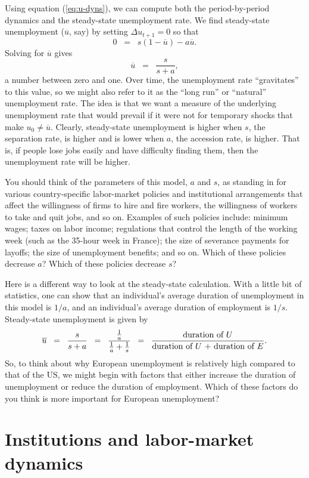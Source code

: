 Using equation (\ref{eq:u-dyns}), we can compute
both the period-by-period dynamics and the steady-state unemployment rate.
We find steady-state unemployment ($\overline{u}$, say) by setting $\Delta u_{t+1}=0$ so that
\[
    0 \;\;=\;\; s(1-\overline{u})-a\overline{u}.
\]
Solving for $\overline{u}$ gives
\[
    \overline{u} \;\;=\;\; \frac{s}{s+a},
\]
a number between zero and one. Over time, the unemployment rate ``gravitates'' to this value, so we might also refer to it as the ``long run'' or ``natural'' unemployment rate.
The idea is that we want a measure of the underlying unemployment rate that would prevail if it were not for temporary shocks that make $u_0\ne\overline{u}$.
Clearly, steady-state unemployment is higher when $s$, the separation rate, is higher and is lower when $a$, the accession rate, is higher. That is, if people lose jobs easily and have difficulty finding them, then the unemployment rate will be higher.

You should think of the parameters of this model, $a$ and $s$, as standing in for various country-specific labor-market policies and institutional arrangements that affect the willingness of firms to hire and fire workers, the willingness of workers to take and quit jobs, and so on.
Examples of such policies include: minimum wages;
taxes on labor income; regulations that control the length of the working week (such as the 35-hour week in France); the size of severance payments for layoffs; the size of unemployment benefits; and so on. Which of these policies decrease $a$? Which of these policies decrease $s$?

Here is a different way to look at the steady-state calculation. With a little bit of statistics, one can show that an individual's average duration of unemployment in this model is $1/a$, and an individual's average duration of employment is $1/s$. Steady-state unemployment is given by
\[
    \overline{u} \;\;=\;\; \frac{s}{s+a} \;\;=\;\;
        \frac{\frac{1}{a}}{\frac{1}{a}+\frac{1}{s}}
        \;\;=\;\; \frac{\textmd{duration of  $U$}}{\textmd{duration of $U$ + duration of $E$}}.
\]
So, to think about why European unemployment is relatively high compared to that of the US, we might begin with factors that either increase the duration of unemployment or reduce the duration of employment. Which of these factors do you think is more important for European unemployment?


\section{Institutions 
 and labor-market dynamics}

